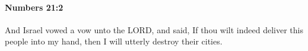 
		\paragraph{Numbers 21:2} %
			\label{NUMBERS-21-2}

			And Israel vowed a vow unto the LORD, and said, If thou wilt indeed deliver this people into my hand, then I will utterly destroy their cities.


